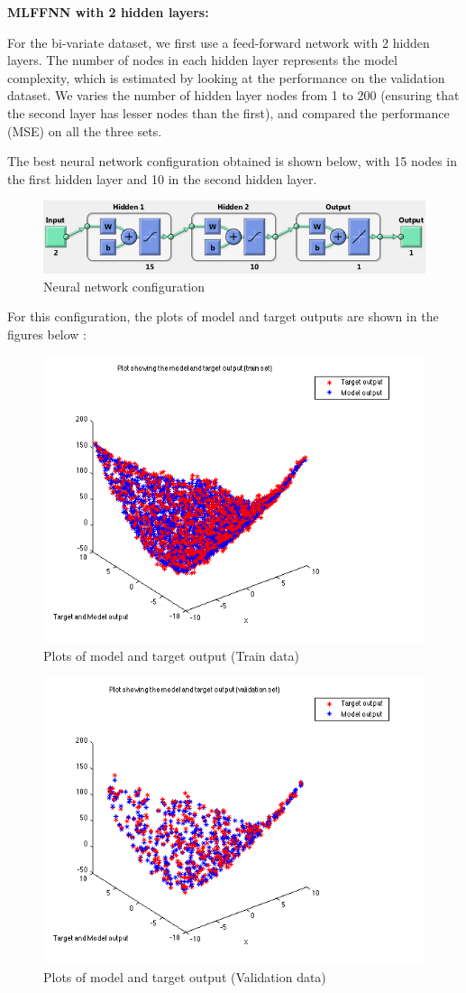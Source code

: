 









\textbf{MLFFNN with 2 hidden layers:}

For the bi-variate dataset, we first use a feed-forward network with 2 hidden layers. The number of nodes in each hidden layer represents the model complexity, which is estimated by looking at the performance on the validation dataset. We varies the number of hidden layer nodes from 1 to 200 (ensuring that the second layer has lesser nodes than the first), and compared the performance (MSE) on all the three sets. 

The best neural network configuration obtained is shown below, with 15 nodes in the first hidden layer and 10 in the second hidden layer.

\begin{figure}[H]
\centering
\includegraphics[width=\linewidth]{Regression/bivariate/net_config_2.png}
\caption{Neural network configuration}
\end{figure}

For this configuration, the plots of model and target outputs are shown in the figures below : 

\begin{figure}[H]
\centering
\includegraphics[width=0.5\linewidth]{Regression/bivariate/output_2layer_train.png}
\caption{Plots of model and target output (Train data)}
\end{figure}

\begin{figure}[H]
\centering
\includegraphics[width=0.5\linewidth]{Regression/bivariate/output_2layer_val.png}
\caption{Plots of model and target output (Validation data)}
\end{figure}

